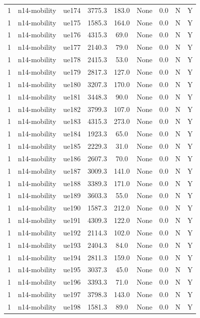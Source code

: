 \begin{table}[ht]
\begin{tabular}{|c|c|c|c|c|c|c|c|c|}
1 & n14-mobility & ue174 & 3775.3 & 183.0 & None & 0.0 & N & Y \\
1 & n14-mobility & ue175 & 1585.3 & 164.0 & None & 0.0 & N & Y \\
1 & n14-mobility & ue176 & 4315.3 & 69.0 & None & 0.0 & N & Y \\
1 & n14-mobility & ue177 & 2140.3 & 79.0 & None & 0.0 & N & Y \\
1 & n14-mobility & ue178 & 2415.3 & 53.0 & None & 0.0 & N & Y \\
1 & n14-mobility & ue179 & 2817.3 & 127.0 & None & 0.0 & N & Y \\
1 & n14-mobility & ue180 & 3207.3 & 170.0 & None & 0.0 & N & Y \\
1 & n14-mobility & ue181 & 3448.3 & 90.0 & None & 0.0 & N & Y \\
1 & n14-mobility & ue182 & 3799.3 & 107.0 & None & 0.0 & N & Y \\
1 & n14-mobility & ue183 & 4315.3 & 273.0 & None & 0.0 & N & Y \\
1 & n14-mobility & ue184 & 1923.3 & 65.0 & None & 0.0 & N & Y \\
1 & n14-mobility & ue185 & 2229.3 & 31.0 & None & 0.0 & N & Y \\
1 & n14-mobility & ue186 & 2607.3 & 70.0 & None & 0.0 & N & Y \\
1 & n14-mobility & ue187 & 3009.3 & 141.0 & None & 0.0 & N & Y \\
1 & n14-mobility & ue188 & 3389.3 & 171.0 & None & 0.0 & N & Y \\
1 & n14-mobility & ue189 & 3603.3 & 55.0 & None & 0.0 & N & Y \\
1 & n14-mobility & ue190 & 1587.3 & 212.0 & None & 0.0 & N & Y \\
1 & n14-mobility & ue191 & 4309.3 & 122.0 & None & 0.0 & N & Y \\
1 & n14-mobility & ue192 & 2114.3 & 102.0 & None & 0.0 & N & Y \\
1 & n14-mobility & ue193 & 2404.3 & 84.0 & None & 0.0 & N & Y \\
1 & n14-mobility & ue194 & 2811.3 & 159.0 & None & 0.0 & N & Y \\
1 & n14-mobility & ue195 & 3037.3 & 45.0 & None & 0.0 & N & Y \\
1 & n14-mobility & ue196 & 3393.3 & 71.0 & None & 0.0 & N & Y \\
1 & n14-mobility & ue197 & 3798.3 & 143.0 & None & 0.0 & N & Y \\
1 & n14-mobility & ue198 & 1581.3 & 89.0 & None & 0.0 & N & Y \\

\end{tabular}
\end{table}
